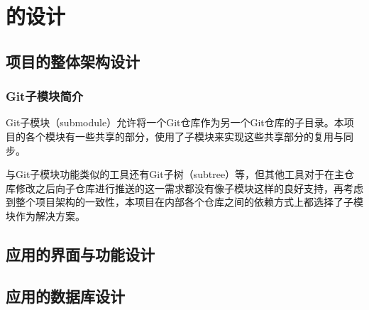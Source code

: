 \chapter{\app 的设计}\label{ch:design}


\section{项目的整体架构设计}\label{sec:arch-design}

\subsection{Git子模块简介}\label{subsec:git-submodule}

Git子模块（submodule）允许将一个Git仓库作为另一个Git仓库的子目录。本项目的各个模块有一些共享的部分，使用了子模块来实现这些共享部分的复用与同步。

与Git子模块功能类似的工具还有Git子树（subtree）等，但其他工具对于在主仓库修改之后向子仓库进行推送的这一需求都没有像子模块这样的良好支持，再考虑到整个项目架构的一致性，本项目在内部各个仓库之间的依赖方式上都选择了子模块作为解决方案。



\section{应用的界面与功能设计}\label{sec:app-design}




\section{应用的数据库设计}\label{sec:db-design}

